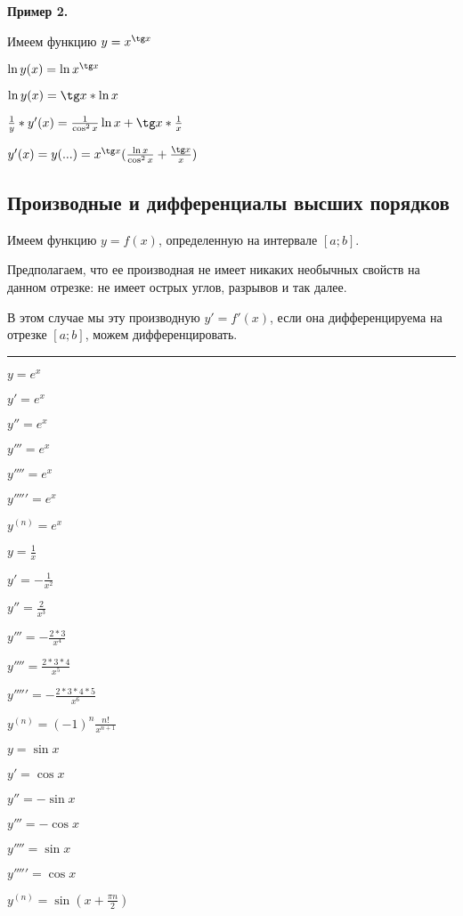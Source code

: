 \documentclass{article}
\begin{document}
\begin{flushleft}
\textbf{Пример 2.}

Имеем функцию $y = x^{\tg x}$

\hfill

$\ln y(x) = \ln x^{\tg x}$

$\ln y(x) = \tg x * \ln x$

$\frac{1}{y} * y'(x) = \frac{1}{\cos^2 x} \ln x + \tg x * \frac{1}{x}$

$y'(x) = y(...) = x^{\tg x} (\frac{\ln x}{\cos^2 x} + \frac{\tg x}{x})$

\pagebreak
\subsection{Производные и дифференциалы высших порядков}

Имеем функцию $y = f(x)$, определенную на интервале $[ a; b ]$.

Предполагаем, что ее производная не имеет никаких необычных свойств на данном отрезке: не имеет острых углов, разрывов и так далее.

В этом случае мы эту производную $y' = f'(x)$, если она дифференцируема на отрезке $[ a; b ]$, можем дифференцировать.

\hfill

\rule{\textwidth}{0.2pt}
\parbox{0.33\textwidth}{
$y = e^x$

$y' = e^x$

$y'' = e^x$

$y''' = e^x$

$y'''' = e^x$

$y''''' = e^x$

$y^{(n)} = e^x$
}
\parbox{0.33\textwidth}{
$y = \frac{1}{x}$

$y' = - \frac{1}{x^2}$

$y'' = \frac{2}{x^3}$

$y''' = - \frac{2 * 3}{x^4}$

$y'''' = \frac{2 * 3 * 4}{x^5}$

$y''''' = -\frac{2 * 3 * 4 * 5}{x^6}$

$y^{(n)} = (-1)^n \frac{n!}{x^{n+1}}$
}
\parbox{0.3\textwidth}{
$y = \sin x$

$y' = \cos x$

$y'' = - \sin x$

$y''' = - \cos x$

$y'''' = \sin x$

$y''''' = \cos x$

$y^{(n)} = \sin (x + \frac{\pi n}{2})$
}


\end{flushleft}
\end{document}
